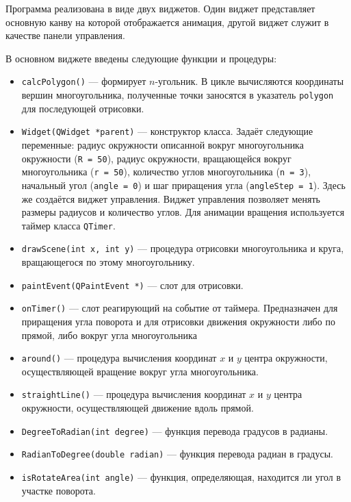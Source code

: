 
Программа реализована в виде двух виджетов. Один виджет представляет основную канву на которой отображается анимация, другой виджет служит в качестве панели управления.

В основном виджете введены следующие функции и процедуры:

\begin{itemize}
\item{\verb|calcPolygon()| --- формирует $n$-угольник. В цикле вычисляются координаты вершин многоугольника, полученные точки заносятся в указатель \verb|polygon| для последующей отрисовки.}

\item{\verb|Widget(QWidget *parent)| --- конструктор класса. Задаёт следующие переменные: радиус окружности описанной вокруг многоугольника окружности (\verb|R = 50|), радиус окружности, вращающейся вокруг многоугольника (\verb|r = 50|), количество углов многоугольника (\verb|n = 3|), начальный угол (\verb|angle = 0|) и шаг приращения угла (\verb|angleStep = 1|). Здесь же создаётся виджет управления. Виджет управления позволяет менять размеры радиусов и количество углов. Для анимации вращения используется таймер класса \verb|QTimer|.}

\item{\verb|drawScene(int x, int y)| --- процедура отрисовки многоугольника и круга, вращающегося по этому многоугольнику.}

\item{\verb|paintEvent(QPaintEvent *)| --- слот для отрисовки.}

\item{\verb|onTimer()| --- слот реагирующий на событие от таймера. Предназначен для приращения угла поворота и для отрисовки движения окружности либо по прямой, либо вокруг угла многоугольника}

\item{\verb|around()| --- процедура вычисления координат $x$ и $y$ центра окружности, осуществляющей вращение вокруг угла многоугольника.}

\item{\verb|straightLine()| --- процедура вычисления координат $x$ и $y$ центра окружности, осуществляющей движение вдоль прямой.}

\item{\verb|DegreeToRadian(int degree)| --- функция перевода градусов в радианы.}

\item{\verb|RadianToDegree(double radian)| --- функция перевода радиан в градусы.}

\item{\verb|isRotateArea(int angle)| --- функция, определяющая, находится ли угол в участке поворота.}
\end{itemize}

